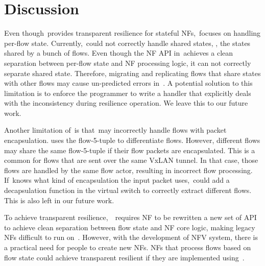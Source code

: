 \section{Discussion}
\label{sec:discussion}

Even though~\nfactor provides transparent resilience for stateful NFs,~\nfactor focuses on handling per-flow state. Currently,~\nfactor could not correctly handle shared states, \ie, the states shared by a bunch of flows. Even though the NF API in~\nfactor achieves a clean separation between per-flow state and NF processing logic, it can not correctly separate shared state. Therefore, migrating and replicating flows that share states with other flows may cause un-predicted errors in~\nfactor. A potential solution to this limitation is to enforce the programmer to write a handler that explicitly deals with the inconsistency during resilience operation. We leave this to our future work.

Another limitation of~\nfactor is that~\nfactor may incorrectly handle flows with packet encapsulation. \nfactor uses the flow-5-tuple to differentiate flows. However, different flows may share the same flow-5-tuple if their flow packets are encapsulated. This is a common for flows that are sent over the same VxLAN tunnel. In that case, those flows are handled by the same flow actor, resulting in incorrect flow processing. If~\nfactor knows what kind of encapsulation the input packet uses,~\nfactor could add a decapsulation function in the virtual switch to correctly extract different flows. This is also left in our future work.

To achieve transparent resilience,~\nfactor~requires NF to be rewritten a new set of API to achieve clean separation between flow state and NF core logic, making legacy NFs difficult to run on~\nfactor. However, with the development of NFV system, there is a practical need for people to create new NFs. NFs that process flows based on flow state could achieve transparent resilient if they are implemented using~\nfactor.
